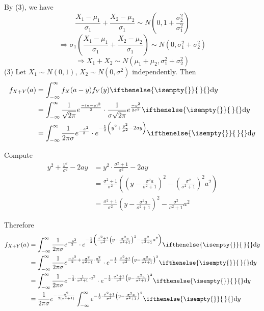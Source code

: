 \documentclass[a4paper,11pt]{amsbook}
\makeatletter
\renewenvironment{proof}[1][\proofname]{\par
    \pushQED{\qed}%
    \normalfont \topsep6\p@\@plus6\p@\relax
    \trivlist
    \itemindent\z@ %
    \item[\hskip\labelsep
          \scshape
      #1\@addpunct{.}]\ignorespaces
}{%
    \popQED\endtrivlist\@endpefalse
}
\theoremstyle{definition}
\theoremstyle{remark}
\newcommand\0{\varnothing}
\newcommand\dy[1][]{\ifthenelse{\isempty{#1}}{\,}{}\mathrm{d}y}
\makeatother
\begin{document}
\begin{proof}
        By (3), we have $$\frac{X_1-\mu_1}{\sigma_1}+\frac{X_2-\mu_2}{\sigma_1}\sim N\left(0,1+\frac{\sigma_2^2}{\sigma_1^2}\right)$$
        $$\Rightarrow\sigma_1\left(\frac{X_1-\mu_1}{\sigma_1}+\frac{X_2-\mu_2}{\sigma_1}\right)\sim N(0,\sigma_1^2+\sigma_2^2)$$
        $$\Rightarrow X_1+X_2\sim N(\mu_1+\mu_2,\sigma_1^2+\sigma_2^2)$$
        (3) Let $X_1\sim N(0,1)$, $X_2\sim N(0,\sigma^2)$ independently. Then 
        \begin{align*}
            f_{X+Y}(a)&=\int_{-\infty}^{\infty}f_X(a-y)f_Y(y)\dy \\
            &=\int_{-\infty}^{\infty}\frac{1}{\sqrt{2\pi}}e^{\frac{-(a-y)^2}{2}}\cdot\frac{1}{\sigma\sqrt{2\pi}}e^{\frac{-y^2}{2\sigma^2}}\dy \\
            &=\int_{-\infty}^{\infty}\frac{1}{2\pi\sigma}e^{\frac{-a^2}{2}}\cdot e^{-\frac12\left(y^2+\frac{y^2}{\sigma^2}-2ay\right)}\dy
        \end{align*}

        Compute \begin{align*}
            y^2+\frac{y^2}{\sigma^2}-2ay&=y^2\cdot\frac{\sigma^2+1}{\sigma^2}-2ay \\
            &=\frac{\sigma^2+1}{\sigma^2}\left(\left(y-\frac{\sigma^2a}{\sigma^2+1}\right)^2-\left(\frac{\sigma^2}{\sigma^2+1}\right)^2a^2\right) \\
            &=\frac{\sigma^2+1}{\sigma^2}\left(y-\frac{\sigma^2a}{\sigma^2+1}\right)^2-\frac{\sigma^2}{\sigma^2+1}a^2
        \end{align*}

        Therefore \begin{align*}
            f_{X+Y}(a)&=\int_{-\infty}^{\infty}\frac{1}{2\pi\sigma}e^{\frac{-a^2}{2}}\cdot 
            e^{-\frac12\left(\frac{\sigma^2+1}{\sigma^2}\left(y-\frac{\sigma^2a}{\sigma^2+1}\right)^2-\frac{\sigma^2}{\sigma^2+1}a^2\right)}\dy \\
            &=\int_{-\infty}^{\infty}\frac{1}{2\pi\sigma}e^{\frac{-a^2}{2}+\frac{\sigma^2}{\sigma^2+1}\cdot\frac{a^2}{2}}\cdot 
            e^{-\frac12\cdot\frac{\sigma^2+1}{\sigma^2}\left(y-\frac{\sigma^2a}{\sigma^2+1}\right)^2}\dy \\
            &=\int_{-\infty}^{\infty}\frac{1}{2\pi\sigma}e^{-\frac12\cdot\frac{1}{\sigma^2+1}\cdot a^2}\cdot 
            e^{-\frac12\cdot\frac{\sigma^2+1}{\sigma^2}\left(y-\frac{\sigma^2a}{\sigma^2+1}\right)^2}\dy \\
            &=\frac{1}{2\pi\sigma}e^{-\frac{a^2}{2(\sigma^2+1)}}\int_{-\infty}^{\infty}
            e^{-\frac12\cdot\frac{\sigma^2+1}{\sigma^2}\left(y-\frac{\sigma^2a}{\sigma^2+1}\right)^2}\dy
        \end{align*}


\end{proof}
\end{document}
